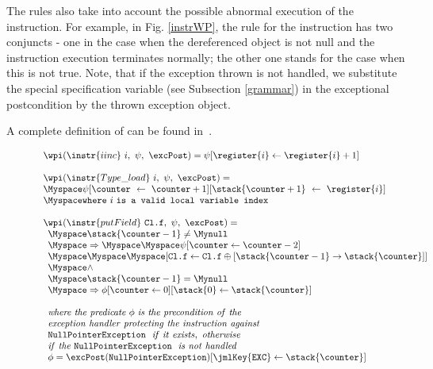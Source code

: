 The rules also take into account the possible abnormal execution of the instruction. For example, in Fig. \ref{instrWP}, the rule for the instruction 
has two conjuncts - one in the case when the dereferenced object is not null and the instruction execution terminates normally; the other one stands for the case when this is not true. Note, that if the exception thrown is not handled,
 we substitute the special specification variable  (see Subsection \ref{grammar}) in the exceptional postcondition by the thrown exception object.     

A complete definition of \wpi can be found in~\cite{WPBC}.
\begin{figure}[ht]

$$
\begin{array}{l}
\wpi(\instr{iinc} \  i , \ \psi, \ \excPost) = \psi[\register{i} \leftarrow \register{i} + 1 ] \\
\\
\wpi(\instr{Type\_load} \ i, \ \psi, \ \excPost) =  \\
\Myspace \psi[\counter \ \leftarrow \ \counter+1] [\stack{\counter+1} \ \leftarrow \ \register{i}] \\
 \Myspace \texttt{where} \ i \ \texttt{is a valid local variable index}   \\
\\ 
\wpi(\instr{putField} \ \texttt{Cl.f}, \ \psi, \ \excPost) = \\
\begin{array}{l}
   	\Myspace	\stack{\counter -1} \not= \Mynull \\
	\Myspace	\Rightarrow  
	\Myspace		%
	\Myspace	 \psi [\counter \leftarrow \counter-2 ] \\[0 mm] 
   		\Myspace\Myspace\Myspace[\texttt{Cl.f} \leftarrow \texttt{Cl.f}\oplus [\stack{\counter -1} \rightarrow \stack{\counter}] ] \\
   \Myspace	\wedge \\
   \Myspace	\stack{\counter-1} = \Mynull \\
 \Myspace	\Rightarrow  \phi[ \counter \leftarrow  0][\stack{0} \leftarrow \stack{\counter}]  \\		  \\
   \it{where \ the \ predicate \ \phi \  is \ the \ precondition \ of \ the} \\
   \it{exception \ handler \ protecting \ the \ instruction \  against} \\ 
   \tt{NullPointerException } \ \it{\ if \ it \  exists, \ otherwise}  \\
   \it{if \ the } \ \tt{ NullPointerException} \ \it{\ is \ not \ handled}    \\
      \phi = \excPost(\tt{NullPointerException})[ \jmlKey{EXC} \leftarrow \stack{\counter}]
    \end{array}
 \end{array} $$


\end{figure}
